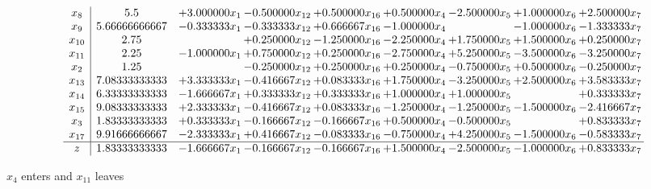 \documentclass[10pt]{article}
\begin{document}
 \[\begin{array}{c| c c@{\hskip 2pt} c@{\hskip 2pt} c@{\hskip 2pt} c@{\hskip 2pt} c@{\hskip 2pt} c@{\hskip 2pt} c@{\hskip 2pt} }
 x_{8}   &  5.5 & + 3.000000 x_{1} & -0.500000 x_{12} & + 0.500000 x_{16} & + 0.500000 x_{4} & -2.500000 x_{5} & + 1.000000 x_{6} & + 2.500000 x_{7}\\
 x_{9}   &  5.66666666667 & -0.333333 x_{1} & -0.333333 x_{12} & + 0.666667 x_{16} & -1.000000 x_{4} &   & -1.000000 x_{6} & -1.333333 x_{7}\\
 x_{10}   &  2.75  &   & + 0.250000 x_{12} & -1.250000 x_{16} & -2.250000 x_{4} & + 1.750000 x_{5} & + 1.500000 x_{6} & + 0.250000 x_{7}\\
 x_{11}   &  2.25 & -1.000000 x_{1} & + 0.750000 x_{12} & + 0.250000 x_{16} & -2.750000 x_{4} & + 5.250000 x_{5} & -3.500000 x_{6} & -3.250000 x_{7}\\
 x_{2}   &  1.25  &   & -0.250000 x_{12} & + 0.250000 x_{16} & + 0.250000 x_{4} & -0.750000 x_{5} & + 0.500000 x_{6} & -0.250000 x_{7}\\
 x_{13}   &  7.08333333333 & + 3.333333 x_{1} & -0.416667 x_{12} & + 0.083333 x_{16} & + 1.750000 x_{4} & -3.250000 x_{5} & + 2.500000 x_{6} & + 3.583333 x_{7}\\
 x_{14}   &  6.33333333333 & -1.666667 x_{1} & + 0.333333 x_{12} & + 0.333333 x_{16} & + 1.000000 x_{4} & + 1.000000 x_{5} &   & + 0.333333 x_{7}\\
 x_{15}   &  9.08333333333 & + 2.333333 x_{1} & -0.416667 x_{12} & + 0.083333 x_{16} & -1.250000 x_{4} & -1.250000 x_{5} & -1.500000 x_{6} & -2.416667 x_{7}\\
 x_{3}   &  1.83333333333 & + 0.333333 x_{1} & -0.166667 x_{12} & -0.166667 x_{16} & + 0.500000 x_{4} & -0.500000 x_{5} &   & + 0.833333 x_{7}\\
 x_{17}   &  9.91666666667 & -2.333333 x_{1} & + 0.416667 x_{12} & -0.083333 x_{16} & -0.750000 x_{4} & + 4.250000 x_{5} & -1.500000 x_{6} & -0.583333 x_{7}\\
\hline
z    &  1.83333333333 & -1.666667 x_{1} & -0.166667 x_{12} & -0.166667 x_{16} & + 1.500000 x_{4} & -2.500000 x_{5} & -1.000000 x_{6} & + 0.833333 x_{7}\\
\end{array}\]


 $ x_{4} $ enters and $ x_{11} $ leaves 
\end{document}

